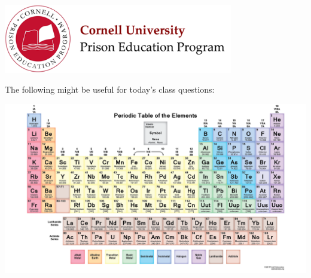 \documentclass[12pt]{exam}
\begin{document}

\begin{flushright}
\vspace{0.2in}
\end{flushright}

\begin{center}
\includegraphics[width=10cm]{../images/logo.png}
\end{center}

\begin{center}
\end{center}
\vspace{0.5in}

\vspace{0.2in}

The following might be useful for today's class questions:
\begin{center}
\noindent\includegraphics[width=\textwidth]{../images/periodicTable.png}
\end{center}


\clearpage
\end{document}
